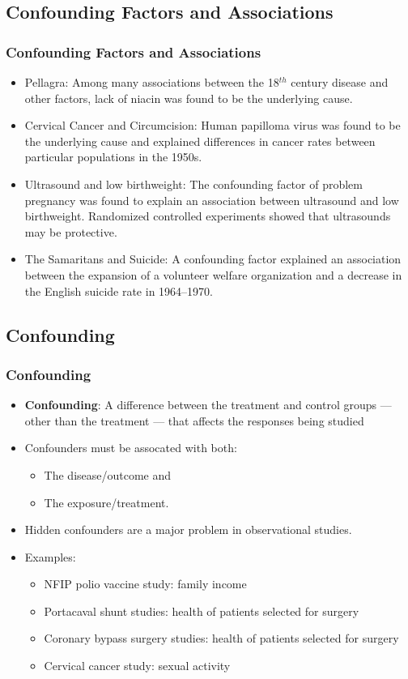\documentclass[t,xcolor=pst,dvips]{beamer}
\begin{document}
\subsection{Confounding Factors and Associations}
\begin{frame}[t]\frametitle{Confounding Factors and Associations}
{\small
\begin{itemize}
\item Pellagra:  Among many associations between the 18${}^{th}$ century disease and other factors, lack of niacin
  was found to be the underlying cause.
\item Cervical Cancer and Circumcision: Human papilloma virus was found to be the underlying cause
  and explained differences in cancer rates between particular populations in the 1950s.
\item Ultrasound and low birthweight:  The confounding factor of problem pregnancy was found to 
  explain an association between ultrasound and low birthweight.  Randomized controlled experiments 
  showed that ultrasounds may be protective.
\item The Samaritans and Suicide:  A confounding factor explained an association between the 
  expansion of a volunteer welfare organization and a decrease in the English suicide rate 
  in 1964--1970.
\end{itemize}
}
\end{frame}

\subsection{Confounding}
\begin{frame}[t]\frametitle{Confounding}

{\small
\begin{itemize}
\item \textbf{Confounding}:  A difference between the treatment and control groups --- other than the treatment ---
   that affects the responses being studied
\item Confounders must be assocated with both:
   \begin{itemize} 
     \item The disease/outcome and 
     \item The exposure/treatment.
   \end{itemize}
\item Hidden confounders are a major problem in observational studies.
\item Examples:
   \begin{itemize}
   \item NFIP polio vaccine study:  family income
   \item Portacaval shunt studies:  health of patients selected for surgery
   \item Coronary bypass surgery studies:  health of patients selected for surgery
   \item Cervical cancer study: sexual activity
   \end{itemize}
\end{itemize}}
\end{frame}
\end{document}
